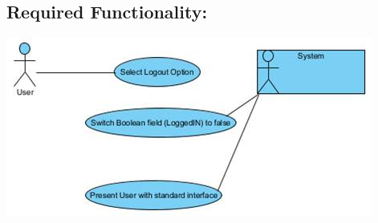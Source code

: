 \documentclass[a4paper,11pt]{article}
\begin{document}
\subsection{Required Functionality:} 
\includegraphics[width=1\linewidth]{./Images/CRUDThread/Diagrams/18.jpg}\\
\end{document}
